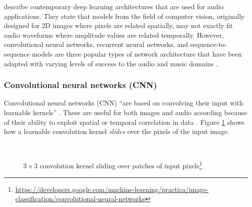 \documentclass[report.tex]{subfiles}
\begin{document}
\textcite{audiodeeplearning} describe contemporary deep learning architectures that are used for audio applications. They state that models from the field of computer vision, originally designed for 2D images where pixels are related spatially, may not exactly fit audio waveforms where amplitude values are related temporally. However, convolutional neural networks, recurrent neural networks, and sequence-to-sequence models are three popular types of network architecture that have been adapted with varying levels of success to the audio and music domains \parencite{audiodeeplearning}.

\subsubsection{Convolutional neural networks (CNN)}

Convolutional neural networks (CNN) ``are based on convolving their input with learnable kernels'' \parencite[3]{audiodeeplearning}. These are useful for both images and audio according because of their ability to exploit spatial or temporal correlation in data \parencite{cnns}. Figure \ref{fig:cnnbasic} shows how a learnable convolution kernel \textit{slides} over the pixels of the input image.

\begin{figure}[ht]
	\centering
        \begin{minipage}{1.\textwidth}
		\renewcommand\footnoterule{} %
		\renewcommand{\thempfootnote}{\fnsymbol{mpfootnote}}
		\centering
		\\
		\caption[$3 \times 3$ convolution kernel sliding over patches of input pixels]{$3 \times 3$ convolution kernel sliding over patches of input pixels\footnote[1]{\url{https://developers.google.com/machine-learning/practica/image-classification/convolutional-neural-networks}}}
		\label{fig:cnnbasic}
	\end{minipage}
\end{figure}
\end{document}
